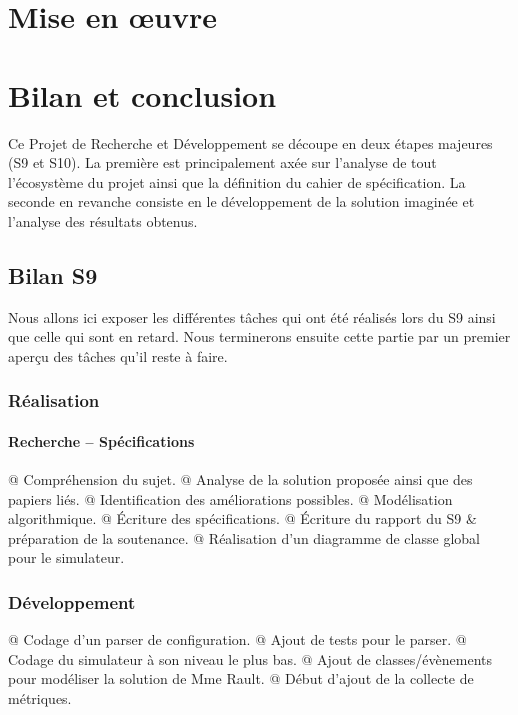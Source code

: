 \documentclass[final]{polytech/polytech}
\begin{document}
	
\chapter{Mise en œuvre}
	
\chapter{Bilan et conclusion}
	Ce Projet de Recherche et Développement se découpe en deux étapes majeures (S9 et S10).
	La première est principalement axée sur l'analyse de tout l'écosystème du projet ainsi que la définition du cahier de spécification.
	La seconde en revanche consiste en le développement de la solution imaginée et l'analyse des résultats obtenus.
	
	\section{Bilan S9}
		Nous allons ici exposer les différentes tâches qui ont été réalisés lors du S9 ainsi que celle qui sont en retard.
		Nous terminerons ensuite cette partie par un premier aperçu des tâches qu'il reste à faire.
		
		\subsection{Réalisation}
			\subsubsection{Recherche -- Spécifications}
				\begin{easylist}[itemize]
					@ Compréhension du sujet.
					@ Analyse de la solution proposée ainsi que des papiers liés.
					@ Identification des améliorations possibles.
					@ Modélisation algorithmique.
					@ Écriture des spécifications.
					@ Écriture du rapport du S9 \& préparation de la soutenance.
					@ Réalisation d'un diagramme de classe global pour le simulateur.
				\end{easylist}

			\subsection{Développement}
				\begin{easylist}[itemize]
					@ Codage d'un parser de configuration.
					@ Ajout de tests pour le parser.
					@ Codage du simulateur à son niveau le plus bas.
					@ Ajout de classes/évènements pour modéliser la solution de Mme Rault.
					@ Début d'ajout de la collecte de métriques.
				\end{easylist}
\end{document}
